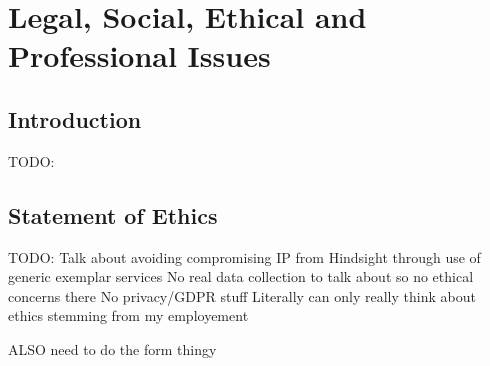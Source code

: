 \chapter{Legal, Social, Ethical and Professional Issues}
\section{Introduction}
TODO:
\section{Statement of Ethics}
TODO:
Talk about avoiding compromising IP from Hindsight through use of generic exemplar services
No real data collection to talk about so no ethical concerns there
No privacy/GDPR stuff
Literally can only really think about ethics stemming from my employement

ALSO need to do the form thingy